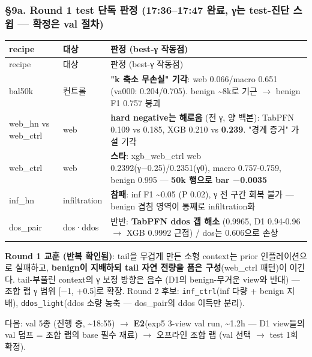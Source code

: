 \subsubsection{§9a. Round 1 test 단독 판정 (17:36–17:47 완료, γ는 test-진단 스윕 — 확정은 val 절차)}
\begingroup
\footnotesize
\begin{longtable}{>{\raggedright\arraybackslash}p{}>{\raggedright\arraybackslash}p{}>{\raggedright\arraybackslash}p{}}
\toprule
recipe & 대상 & 판정 (best-γ 작동점) \\ \midrule
\endfirsthead
recipe & 대상 & 판정 (best-γ 작동점) \\ \midrule
\endhead
{}bal50k & 컨트롤 & \textbf{"k 축소 무손실" 기각}: web 0.066/\allowbreak{}macro 0.651 (va000: 0.204/\allowbreak{}0.705). benign \textasciitilde{}8k로 기근  \ensuremath{\rightarrow}  benign F1 0.757 붕괴 \\
{}web\_\allowbreak{}hn vs web\_\allowbreak{}ctrl & web & \textbf{hard negative는 해로움} (전 γ, 양 백본): TabPFN 0.109 vs 0.185, XGB 0.210 vs \textbf{0.239}. "경계 증거" 가설 기각 \\
{}web\_\allowbreak{}ctrl & web & \textbf{스타}: xgb\_\allowbreak{}web\_\allowbreak{}ctrl web 0.2392(γ−0.25)/\allowbreak{}0.2351(γ0), macro 0.757-0.759, benign 0.995 — \textbf{50k 행으로 bar −0.0035} \\
{}inf\_\allowbreak{}hn & infiltration & \textbf{참패}: inf F1 \textasciitilde{}0.05 (P 0.02), γ 전 구간 회복 불가 — benign 겹침 영역이 통째로 infiltration화 \\
{}dos\_\allowbreak{}pair & dos·ddos & 반반: \textbf{TabPFN ddos 갭 해소} (0.9965, D1 0.94-0.96  \ensuremath{\rightarrow}  XGB 0.9992 근접) /\allowbreak{} dos는 0.606으로 손상 \\
\bottomrule
\end{longtable}
\endgroup
\textbf{Round 1 교훈 (반복 확인됨)}: tail을 무겁게 만든 소형 context는 prior 인플레이션으로 실패하고, \textbf{benign이 지배하되 tail 자연 전량을 품은 구성}(web\_\allowbreak{}ctrl 패턴)이 이긴다. tail-부풀린 context의 γ 보정 방향은 음수 (D1의 benign-무거운 view와 반대) — 조합 랩 γ 범위 [−1, +\allowbreak{}0.5]로 확장. Round 2 후보: \texttt{inf\_\allowbreak{}\allowbreak{}ctrl\allowbreak{}}(inf 다량 +\allowbreak{} benign 지배), \texttt{ddos\_\allowbreak{}\allowbreak{}lig\allowbreak{}ht}(ddos 소량 농축 — dos\_\allowbreak{}pair의 ddos 이득만 분리).

다음: val 5종 (진행 중, \textasciitilde{}18:55)  \ensuremath{\rightarrow}  \textbf{E2}(exp5 3-view val run, \textasciitilde{}1.2h — D1 view들의 val 덤프 =\allowbreak{} 조합 랩의 base 필수 재료)  \ensuremath{\rightarrow}  오프라인 조합 랩 (val 선택  \ensuremath{\rightarrow}  test 1회 확정).

